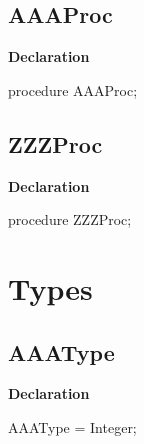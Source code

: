 \documentclass{report}
\begin{document}
\subsection*{AAAProc}
\begin{list}{}{
\setlength{\itemindent}{0cm}
\setlength{\listparindent}{0cm}
\setlength{\leftmargin}{\evensidemargin}
\addtolength{\leftmargin}{\tmplength}
\settowidth{\labelsep}{X}
\addtolength{\leftmargin}{\labelsep}
\setlength{\labelwidth}{\tmplength}
}
\begin{flushleft}
\item[\textbf{Declaration}\hfill]
\begin{ttfamily}
procedure AAAProc;\end{ttfamily}


\end{flushleft}
\end{list}
\subsection*{ZZZProc}
\begin{list}{}{
\setlength{\itemindent}{0cm}
\setlength{\listparindent}{0cm}
\setlength{\leftmargin}{\evensidemargin}
\addtolength{\leftmargin}{\tmplength}
\settowidth{\labelsep}{X}
\addtolength{\leftmargin}{\labelsep}
\setlength{\labelwidth}{\tmplength}
}
\begin{flushleft}
\item[\textbf{Declaration}\hfill]
\begin{ttfamily}
procedure ZZZProc;\end{ttfamily}


\end{flushleft}
\end{list}
\section{Types}
\subsection*{AAAType}
\begin{list}{}{
\setlength{\itemindent}{0cm}
\setlength{\listparindent}{0cm}
\setlength{\leftmargin}{\evensidemargin}
\addtolength{\leftmargin}{\tmplength}
\settowidth{\labelsep}{X}
\addtolength{\leftmargin}{\labelsep}
\setlength{\labelwidth}{\tmplength}
}
\begin{flushleft}
\item[\textbf{Declaration}\hfill]
\begin{ttfamily}
AAAType = Integer;\end{ttfamily}


\end{flushleft}
\end{list}
\end{document}
